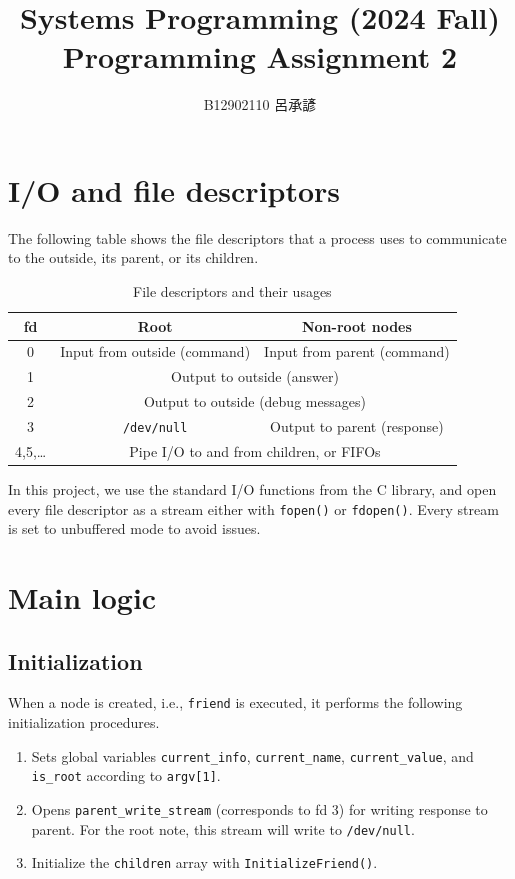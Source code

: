 \documentclass[12pt, a4paper]{article}
\title{%
  \vspace{-1.5cm}
  Systems Programming (2024 Fall)\\
  Programming Assignment 2
}
\author{\Large B12902110 呂承諺}
\date{}
\begin{document}
  \maketitle

  \section{I/O and file descriptors}
  The following table shows the file descriptors that a process uses to communicate
  to the outside, its parent, or its children.
  \begin{table}[H]
    \centering
    \caption{File descriptors and their usages}
    \begin{tabular}{|c|c|c|}
      \hline
      \textbf{fd} & \textbf{Root} & \textbf{Non-root nodes} \\\hline
      0 & Input from outside (command) & Input from parent (command) \\\hline
      1 & \multicolumn{2}{c|}{Output to outside (answer)} \\\hline
      2 & \multicolumn{2}{c|}{Output to outside (debug messages)} \\\hline
      3 & \verb|/dev/null| & Output to parent (response) \\\hline
      4,5,\dots & \multicolumn{2}{c|}{Pipe I/O to and from children, or FIFOs} \\\hline
    \end{tabular}
  \end{table}

  In this project, we use the standard I/O functions from the C library, and open
  every file descriptor as a stream either with \verb|fopen()| or \verb|fdopen()|.
  Every stream is set to unbuffered mode to avoid issues.

  \section{Main logic}
  \subsection{Initialization}
  When a node is created, i.e., \verb|friend| is executed, it performs the
  following initialization procedures.
  \begin{enumerate}
    \item Sets global variables \verb|current_info|, \verb|current_name|,
    \verb|current_value|, and \verb|is_root| according to \verb|argv[1]|.
    \item Opens \verb|parent_write_stream| (corresponds to fd 3) for writing response to parent.
    For the root note, this stream will write to \verb|/dev/null|.
    \item Initialize the \verb|children| array with \verb|InitializeFriend()|.
  \end{enumerate}
\end{document}

